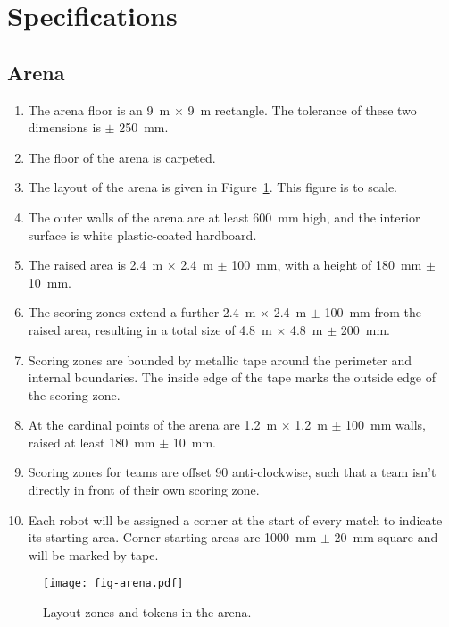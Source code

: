\section{Specifications}
\label{sec:specs}

\subsection{Arena}
\label{spec:arena}

\begin{enumerate}
  \item The arena floor is an \SI{9}{m} $\times$ \SI{9}{m} rectangle. The
        tolerance of these two dimensions is $\pm$ \SI{250}{mm}.
  \item The floor of the arena is carpeted.
  \item The layout of the arena is given in Figure~\ref{fig:arena}. This
        figure is to scale.
  \item The outer walls of the arena are at least \SI{600}{mm} high, and the
        interior surface is white plastic-coated hardboard.
  \item The raised area is \SI{2.4}{m} $\times$ \SI{2.4}{m} $\pm$ \SI{100}{mm},
        with a height of \SI{180}{mm} $\pm$ \SI{10}{mm}.
  \item The scoring zones extend a further \SI{2.4}{m} $\times$ \SI{2.4}{m} $\pm$ \SI{100}{mm}
        from the raised area, resulting in a total size of \SI{4.8}{m} $\times$ \SI{4.8}{m} $\pm$ \SI{200}{mm}.
  \item Scoring zones are bounded by metallic tape around the perimeter
        and internal boundaries. The inside edge of the tape marks the outside
        edge of the scoring zone.
  \item At the cardinal points of the arena are \SI{1.2}{m} $\times$ \SI{1.2}{m} $\pm$ \SI{100}{mm} walls,
        raised at least \SI{180}{mm} $\pm$ \SI{10}{mm}.
  \item Scoring zones for teams are offset 90\degree{} anti-clockwise, such
        that a team isn't directly in front of their own scoring zone.
  \item Each robot will be assigned a corner at the start of every match to indicate its starting area.
        Corner starting areas are \SI{1000}{mm} $\pm$ \SI{20}{mm} square and will be marked by tape.
\end{enumerate}

\begin{figure}
  \texttt{[image: fig-arena.pdf]}
  \caption{Layout zones and tokens in the arena.}
  \label{fig:arena}
\end{figure}

